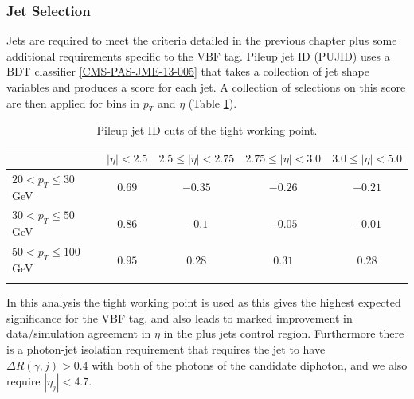 \subsubsection{Jet Selection}
Jets are required to meet the criteria detailed in the previous chapter plus some additional requirements specific to the VBF tag.
Pileup jet ID (PUJID) uses a BDT classifier \ref{CMS-PAS-JME-13-005} that takes a collection of jet shape variables and produces a score for each jet. A collection of selections on this score are then applied for bins in $p_{T}$ and $\eta$ (Table \ref{tab:event_selection:tight_pujid}). 
\begin{table}[h!]
    \centering
    \renewcommand{\arraystretch}{1.3}
    \begin{tabular}{ l | c c c c }
        \thickhline
         & $|\eta| < 2.5$ & $2.5 \leq |\eta| < 2.75$ & $2.75 \leq |\eta| < 3.0$ & $3.0 \leq |\eta| < 5.0$ \\
        \hline
        $20 < p_{T} \leq 30$\,GeV  & $0.69$ & $-0.35$ & $-0.26$ & $-0.21$ \\
        $30 < p_{T} \leq 50$\,GeV  & $0.86$ & $-0.1$  & $-0.05$ & $-0.01$ \\
        $50 < p_{T} \leq 100$\,GeV & $0.95$ & $0.28$  & $0.31$  & $0.28$  \\
        \thickhline
\end{tabular}
    \caption{Pileup jet ID cuts of the tight working point.}
    \label{tab:event_selection:tight_pujid}
\end{table}
In this analysis the tight working point is used as this gives the highest expected significance for the VBF tag, and also leads to marked improvement in data/simulation agreement in $\eta$ in the \Zee plus jets control region.  
Furthermore there is a photon-jet isolation requirement that requires the jet to have $\Delta{R}(\gamma,j) > 0.4$ with both of the photons of the candidate diphoton, and we also require $|\eta_{j}| < 4.7$.







